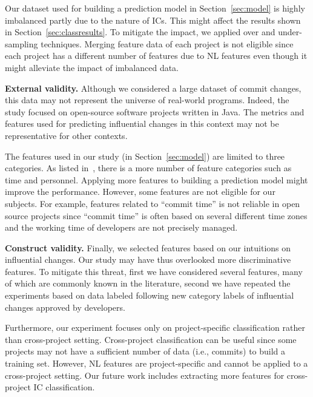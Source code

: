 Our dataset used for building a prediction model in Section~\ref{sec:model} is highly imbalanced partly due to 
the nature of ICs. This might affect the results shown in Section~\ref{sec:classresults}. 
To mitigate the impact, we applied over and under-sampling techniques.
Merging feature data of each project is not eligible since each project has a different number of features 
due to NL features even though it might alleviate the impact of imbalanced data.



\textbf{External validity.} Although we considered a large dataset of commit
changes, this data may not represent the universe of real-world programs.
Indeed, the study focused on open-source software projects written in Java.
The metrics and features used for predicting influential changes in this context
may not be representative for other contexts.

The features used in our study (in Section~\ref{sec:model})
are limited to three categories. As listed in~\cite{shihab_industrial_2012}, there is a more number of feature categories such as time and personnel. Applying more features to building a prediction model might improve the performance. However, some features are not eligible for our subjects. 
For example, features related to ``commit time'' is not reliable in open source projects since ``commit time'' is often based on several different time zones and the working time of developers are not precisely managed.


\textbf{Construct validity.} Finally, we selected features based on
our intuitions on influential changes. Our study may have thus overlooked more
discriminative features. To mitigate this threat, first we have considered several
features, many of which are commonly known in the literature, second we have repeated
the experiments based on data labeled following  new category labels of influential changes
approved by developers. 

Furthermore, our experiment focuses only on project-specific classification rather than cross-project setting. Cross-project classification can be useful since some projects may not have a sufficient number of data (i.e., commits) to build a training set. However, NL features are project-specific and cannot be
applied to a cross-project setting. 
Our future work includes extracting more features for cross-project IC classification.
